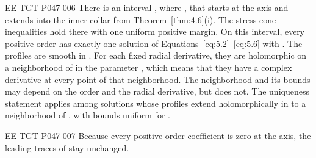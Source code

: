 \begin{lemma}
\label{lem:5.1}
\begin{EESegment}{EE-TGT-P047-006}
There is an interval , where
, that starts at the axis and extends into the inner collar from
Theorem~\ref{thm:4.6}\textup{(i)}. The stress cone inequalities hold there with one uniform
positive margin. On this interval, every positive order has exactly one solution of
Equations~\eqref{eq:5.2}--\eqref{eq:5.6} with
. The profiles are smooth in
. For each fixed radial derivative, they are holomorphic on a neighborhood
of  in the parameter , which means that they
have a complex derivative at every point of that neighborhood. The neighborhood and
its bounds may depend on the order and the radial derivative, but
 does not. The uniqueness statement applies among solutions whose profiles
extend holomorphically in  to a neighborhood of
, with bounds uniform for
.
\end{EESegment}
\end{lemma}

\begin{EESegment}{EE-TGT-P047-007}
Because every positive-order coefficient is zero at the axis, the leading traces of
 stay unchanged.
\end{EESegment}

